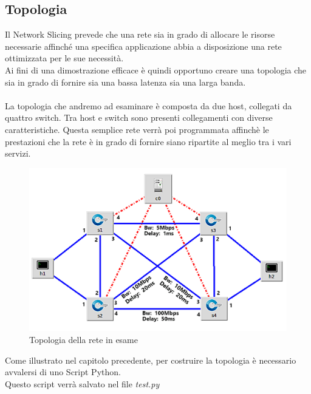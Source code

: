 \subsection{Topologia}\label{ch:3.2.1}
Il Network Slicing prevede che una rete sia in grado di allocare le risorse necessarie affinché una specifica applicazione abbia a disposizione una rete ottimizzata per le sue necessità.\\
Ai fini di una dimostrazione efficace è quindi opportuno creare una topologia che sia in grado di fornire sia una bassa latenza sia una larga banda.\\\\
La topologia che andremo ad esaminare è composta da due host, collegati da quattro switch. Tra host e switch sono presenti collegamenti con diverse caratteristiche. Questa semplice rete verrà poi programmata affinchè le prestazioni che la rete è in grado di fornire siano ripartite al meglio tra i vari servizi.\\\begin{figure}[H]
	\centering
	\includegraphics[width=1\linewidth]{../immagini/esempio/topo}
	\caption[Topologia d'esempio]{Topologia della rete in esame}
	\label{fig:topo}
\end{figure}
Come illustrato nel capitolo precedente, per costruire la topologia è necessario avvalersi di uno Script Python.\\Questo script verrà salvato nel file \textit{test.py}\\

